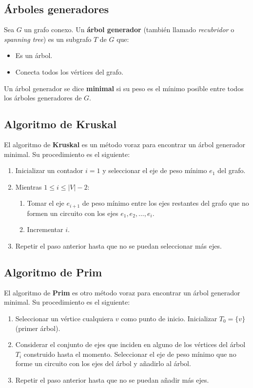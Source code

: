 \documentclass{article}
\begin{document}
\subsection{Árboles generadores}
Sea $G$ un grafo conexo. Un \textbf{árbol generador} (también llamado \textit{recubridor} o \textit{spanning tree}) es un subgrafo $T$ de $G$ que:
\begin{itemize}
    \item Es un árbol.
    \item Conecta todos los vértices del grafo.
\end{itemize}

Un árbol generador se dice \textbf{minimal} si su peso es el mínimo posible entre todos los árboles generadores de $G$.

\subsection{Algoritmo de Kruskal}
El algoritmo de \textbf{Kruskal} es un método voraz para encontrar un árbol generador minimal. Su procedimiento es el siguiente:
\begin{enumerate}
    \item Inicializar un contador $i = 1$ y seleccionar el eje de peso mínimo $e_1$ del grafo.
    \item Mientras $1 \leq i \leq |V| - 2$:
    \begin{enumerate}
        \item Tomar el eje $e_{i+1}$ de peso mínimo entre los ejes restantes del grafo que no formen un circuito con los ejes $e_1, e_2, \dots, e_i$.
        \item Incrementar $i$.
    \end{enumerate}
    \item Repetir el paso anterior hasta que no se puedan seleccionar más ejes.
\end{enumerate}

\subsection{Algoritmo de Prim}
El algoritmo de \textbf{Prim} es otro método voraz para encontrar un árbol generador minimal. Su procedimiento es el siguiente:
\begin{enumerate}
    \item Seleccionar un vértice cualquiera $v$ como punto de inicio. Inicializar $T_0 = \{v\}$ (primer árbol).
    \item Considerar el conjunto de ejes que inciden en alguno de los vértices del árbol $T_i$ construido hasta el momento. Seleccionar el eje de peso mínimo que no forme un circuito con los ejes del árbol y añadirlo al árbol.
    \item Repetir el paso anterior hasta que no se puedan añadir más ejes.
\end{enumerate}
\end{document}
